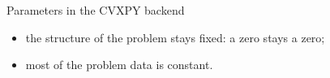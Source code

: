 \documentclass[10pt,mathserif,aspectratio=169]{beamer}
\newcommand{\bul}{\setlength\itemsep{1.1ex}}
\begin{document}
\begin{frame}{Parameters in the CVXPY backend}
\vspace{1ex}
\begin{itemize}\small\bul
  \item the {\color{polyblue}structure of the problem stays fixed}: a zero stays a zero;
  \item most of the problem data is constant.
\end{itemize}
\end{frame}

\end{document}
